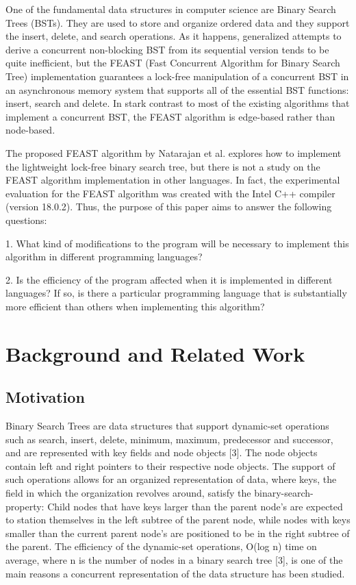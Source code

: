 \documentclass[conference]{IEEEtran}
\begin{document}
One of the fundamental data structures in computer science are Binary Search Trees (BSTs). They are used to store and organize ordered data and they support the insert, delete, and search operations. As it happens, generalized attempts to derive a concurrent non-blocking BST from its sequential version tends to be quite inefficient, but the FEAST (Fast Concurrent Algorithm for Binary Search Tree) implementation guarantees a lock-free manipulation of a concurrent BST in an asynchronous memory system that supports all of the essential BST functions: insert, search and delete. In stark contrast to most of the existing algorithms that implement a concurrent BST, the FEAST algorithm is edge-based rather than node-based.

The proposed FEAST algorithm by Natarajan et al. explores how to implement the lightweight lock-free binary search tree, but there is not a study on the FEAST algorithm implementation in other languages. In fact, the experimental evaluation for the FEAST algorithm was created with the Intel C++ compiler (version 18.0.2). Thus, the purpose of this paper aims to answer the following questions:

1.	What kind of modifications to the program will be necessary to implement this algorithm in different programming languages?

2.	Is the efficiency of the program affected when it is implemented in different languages? If so, is there a particular programming language that is substantially more efficient than others when implementing this algorithm?

\section{Background and Related Work}

\subsection{Motivation}

Binary Search Trees are data structures that support dynamic-set operations such as search, insert, delete, minimum, maximum, predecessor and successor, and are represented with key fields and node objects [3]. The node objects contain left and right pointers to their respective node objects. The support of such operations allows for an organized representation of data, where keys, the field in which the organization revolves around, satisfy the binary-search-property: Child nodes that have keys larger than the parent node’s are expected to station themselves in the left subtree of the parent node, while nodes with keys smaller than the current parent node’s are positioned to be in the right subtree of the parent. The efficiency of the dynamic-set operations, O(log n) time on average, where n is the number of nodes in a binary search tree [3], is one of the main reasons a concurrent representation of the data structure has been studied.
\end{document}
